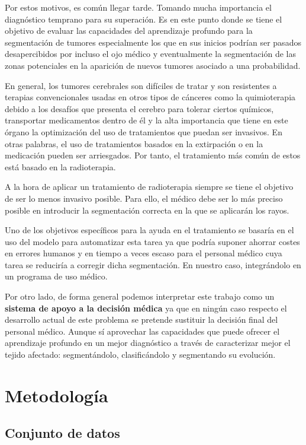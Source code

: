 Por estos motivos, es común llegar tarde. Tomando mucha importancia el diagnóstico temprano para su superación. Es en este punto donde se tiene el objetivo de evaluar las capacidades del aprendizaje profundo para la segmentación de tumores especialmente los que en sus inicios podrían ser pasados desapercibidos por incluso el ojo médico y eventualmente la segmentación de las zonas potenciales en la aparición de nuevos tumores asociado a una probabilidad.

En general, los tumores cerebrales son difíciles de tratar y son resistentes a terapias convencionales usadas en otros tipos de cánceres como la quimioterapia debido a los desafíos que presenta el cerebro para tolerar ciertos químicos, transportar medicamentos dentro de él y la alta importancia que tiene en este órgano la optimización del uso de tratamientos que puedan ser invasivos. En otras palabras, el uso de tratamientos basados en la extirpación o en la medicación pueden ser arriesgados. Por tanto, el tratamiento más común de estos está basado en la radioterapia.

A la hora de aplicar un tratamiento de radioterapia siempre se tiene el objetivo de ser lo menos invasivo posible. Para ello, el médico debe ser lo más preciso posible en introducir la segmentación correcta en la que se aplicarán los rayos. 

Uno de los objetivos específicos para la ayuda en el tratamiento se basaría en el uso del modelo para automatizar esta tarea ya que podría suponer ahorrar costes en errores humanos y en tiempo a veces escaso para el personal médico cuya tarea se reduciría a corregir dicha segmentación. En nuestro caso, integrándolo en un programa de uso médico. 

Por otro lado, de forma general podemos interpretar este trabajo como un \textbf{sistema de apoyo a la decisión médica} ya que en ningún caso respecto el desarrollo actual de este problema se pretende sustituir la decisión final del personal médico. Aunque sí aprovechar las capacidades que puede ofrecer el aprendizaje profundo en un mejor diagnóstico a través de caracterizar mejor el tejido afectado: segmentándolo, clasificándolo y segmentando su evolución.


\section{Metodología}

\subsection{Conjunto de datos}

